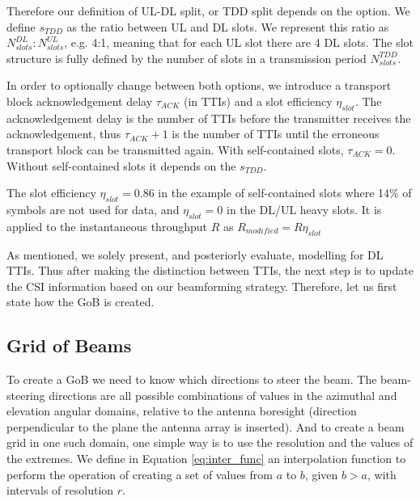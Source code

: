 Therefore our definition of \ac{UL}-\ac{DL} split, or \ac{TDD} split depends on the option. We define $s_{TDD}$ as the ratio between UL and DL slots. We represent this ratio as $N^{DL}_{slots} : N^{UL}_{slots}$, e.g. 4:1, meaning that for each UL slot there are 4 DL slots. The slot structure is fully defined by the number of slots in a transmission period $N^{TDD}_{slots}$.

In order to optionally change between both options, we introduce a transport block acknowledgement delay $\tau_{ACK}$ (in TTIs)  and a slot efficiency $\eta_{slot}$. The acknowledgement delay is the number of TTIs before the transmitter receives the acknowledgement, thus $\tau_{ACK} + 1$ is the number of TTIs until the erroneous transport block can be transmitted again. With self-contained slots, $\tau_{ACK} = 0$. Without self-contained slots it depends on the $s_{TDD}$.

The slot efficiency $\eta_{slot} = 0.86$ in the example of self-contained slots where 14\% of symbols are not used for data, and $\eta_{slot} = 0$ in the DL/UL heavy slots. It is applied to the instantaneous throughput $R$ as $R_{modified} = R \eta_{slot}$

\begin{comment}
Equations \eqref{eq:tdd_split} and \eqref{eq:slot_per}.

\begin{align}
    s_\text{TDD} &= N^\text{DL}_\text{slots} \ / \ N^\text{UL}_\text{slots} \label{eq:tdd_split} \\
    P_\text{slot} &= N^\text{DL}_\text{slots} + N^\text{UL}_\text{slots} \label{eq:slot_per}
\end{align}
\end{comment}

As mentioned, we solely present, and posteriorly evaluate, modelling for DL TTIs. Thus after making the distinction between TTIs, the next step is to update the CSI information based on our beamforming strategy. Therefore, let us first state how the \ac{GoB} is created.

\subsection*{Grid of Beams}
\label{sec:GoB}

To create a GoB we need to know which directions to steer the beam. The beam-steering directions are all possible combinations of values in the azimuthal and elevation angular domains, relative to the antenna boresight (direction perpendicular to the plane the antenna array is inserted). And to create a beam grid in one such domain, one simple way is to use the resolution and the values of the extremes. We define in Equation \eqref{eq:inter_func} an interpolation function to perform the operation of creating a set of values from $a$ to $b$, given $b > a$, with intervals of resolution $r$.


